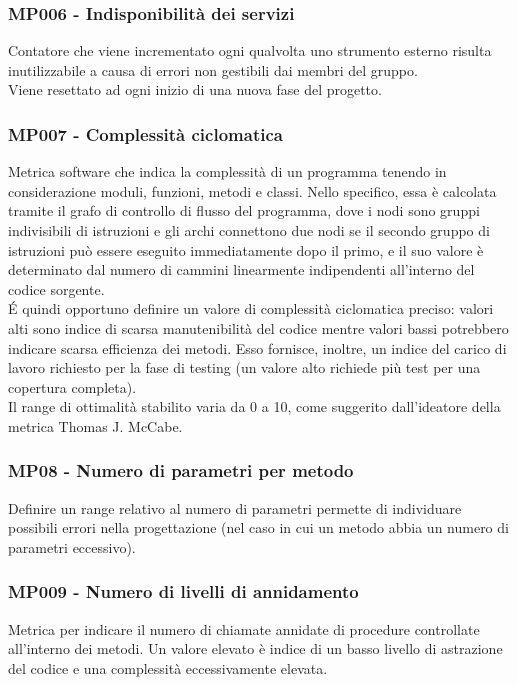 \subsubsection{MP006 - Indisponibilità dei servizi}
Contatore che viene incrementato ogni qualvolta uno strumento esterno risulta inutilizzabile a causa di errori non gestibili dai membri del gruppo.\\
Viene resettato ad ogni inizio di una nuova fase del progetto.

\subsubsection{MP007 - Complessità ciclomatica}
Metrica software che indica la complessità di un programma tenendo in considerazione moduli, funzioni, metodi e classi.
Nello specifico, essa è calcolata tramite il grafo di controllo di flusso del programma, dove i nodi sono gruppi indivisibili di istruzioni e gli archi connettono due nodi se il secondo gruppo di istruzioni può essere eseguito immediatamente dopo il primo, e il suo valore è determinato dal numero di cammini linearmente indipendenti all'interno del codice sorgente.\\
\'E quindi opportuno definire un valore di complessità ciclomatica preciso: valori alti sono indice di scarsa manutenibilità del codice mentre valori bassi potrebbero indicare scarsa efficienza dei metodi.
Esso fornisce, inoltre, un indice del carico di lavoro richiesto per la fase di testing (un valore alto richiede più test per una copertura completa).\\
Il range di ottimalità stabilito varia da 0 a 10, come suggerito dall'ideatore della metrica Thomas J. McCabe.  

\subsubsection{MP08 - Numero di parametri per metodo}
Definire un range relativo al numero di parametri permette di individuare possibili errori nella progettazione (nel caso in cui un metodo abbia un numero di parametri eccessivo).

\subsubsection{MP009 - Numero di livelli di annidamento}
Metrica per indicare il numero di chiamate annidate di procedure controllate all'interno dei metodi.\newline
Un valore elevato è indice di un basso livello di astrazione del codice e una complessità eccessivamente elevata. 

